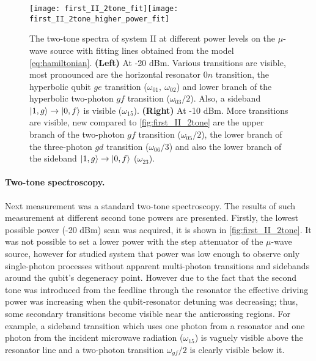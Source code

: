 \documentclass[12pt, twoside]{report}
\DeclarePairedDelimiter\ket{\lvert}{\rangle}
\numberwithin{equation}{section}
\begin{document}
\begin{figure}[t]
\centering
\texttt{[image: first\_II\_2tone\_fit]}\texttt{[image: first\_II\_2tone\_higher\_power\_fit]}

\caption{The two-tone spectra of system II at different power levels on the $\mu$-wave source with fitting lines obtained from the model \eqref{eq:hamiltonian}. \textbf{(Left)} At -20 dBm. Various transitions are visible, most pronounced are the horizontal resonator $0n$ transition, the hyperbolic qubit $ge$ transition ($\omega_{01},\ \omega_{02}$) and lower branch of the hyperbolic two-photon $gf$ transition ($\omega_{03}/2$). Also, a sideband $\ket{1,g}\rightarrow \ket{0,f}$ is visible ($\omega_{15}$). \textbf{(Right)} At -10 dBm. More transitions are visible, new compared to \autoref{fig:first_II_2tone} are the upper branch of the two-photon $gf$ transition ($\omega_{05}/2$), the lower branch of the three-photon $gd$ transition ($\omega_{06}/3$) and also the lower branch of the sideband $\ket{1,g}\rightarrow \ket{0,f}$ ($\omega_{23}$).}
\label{fig:first_II_2tone}
\end{figure}


\paragraph{Two-tone spectroscopy.} Next measurement was a standard two-tone spectroscopy. The results of such measurement at different second tone powers are presented. Firstly, the lowest possible power (-20 dBm) scan was acquired, it is shown in \autoref{fig:first_II_2tone}. It was not possible to set a lower power with the step attenuator of the $\mu$-wave source, however for studied system that power was low enough to observe only single-photon processes without apparent multi-photon transitions and sidebands around the qubit's degeneracy point. However due to the fact that the second tone was introduced from the feedline through the resonator the effective driving power was increasing when the qubit-resonator detuning was decreasing; thus, some secondary transitions become visible near the anticrossing regions. For example, a sideband transition which uses one photon from a resonator and one photon from the incident microwave radiation ($\omega_{15}$) is vaguely visible above the resonator line and a two-photon transition $\omega_{gf}/2$ is clearly visible below it.
\end{document}
